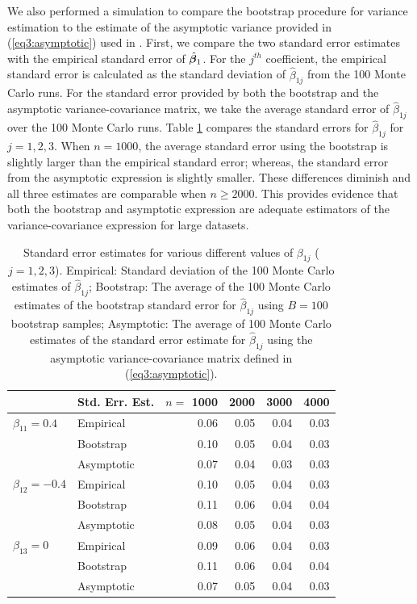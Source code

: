 We also performed a simulation to compare the bootstrap procedure for variance estimation to the estimate of the asymptotic variance provided in (\ref{eq3:asymptotic}) used in . First, we compare the two standard error estimates with the empirical standard error of $\hat{\bm \beta}_{1}$. For the $j^{th}$ coefficient, the empirical standard error is calculated as the standard deviation of $\hat{\beta}_{1j}$ from the 100 Monte Carlo runs. For the standard error provided by both the bootstrap and the asymptotic variance-covariance matrix, we take the average standard error of $\hat{\beta}_{1j}$ over the 100 Monte Carlo runs. Table \ref{table3} compares the standard errors for $\hat{\beta}_{1j}$ for $j = 1, 2, 3$. When $n = 1000$, the average standard error using the bootstrap is slightly larger than the empirical standard error; whereas, the standard error from the asymptotic expression is slightly smaller. These differences diminish and all three estimates are comparable when $n \geq 2000$. This provides  evidence that both the bootstrap and asymptotic expression are adequate estimators of the variance-covariance expression for large datasets. 

\begin{table}[t]
\centering
\setlength{\tabcolsep}{3.2pt}
\caption{Standard error estimates for various different values of $\beta_{1j}$ ($j = 1, 2, 3$). Empirical: Standard deviation of the 100 Monte Carlo estimates of $\hat{\beta}_{1j}$; Bootstrap: The average of the 100 Monte Carlo estimates of the bootstrap standard error for $\hat{\beta}_{1j}$ using $B = 100$ bootstrap samples; Asymptotic: The average of 100 Monte Carlo estimates of the standard error estimate for $\hat{\beta}_{1j}$ using the asymptotic variance-covariance matrix defined in (\ref{eq3:asymptotic}). }
\begin{tabular}{llrrrr}
  \toprule
 & Std. Err.  Est. & $n=$ 1000 & 2000 & 3000 & 4000 \\ 
  \midrule
$\beta_{11} = 0.4$ & Empirical & 0.06 & 0.05 & 0.04 & 0.03 \\ 
   & Bootstrap & 0.10 & 0.05 & 0.04 & 0.03 \\ 
   & Asymptotic & 0.07 & 0.04 & 0.03 & 0.03 \\ 
   \midrule
$\beta_{12} = -0.4$ & Empirical & 0.10 & 0.05 & 0.04 & 0.03 \\ 
  & Bootstrap & 0.11 & 0.06 & 0.04 & 0.04 \\ 
  & Asymptotic & 0.08 & 0.05 & 0.04 & 0.03 \\ 
  \midrule
$\beta_{13} = 0$ & Empirical & 0.09 & 0.06 & 0.04 & 0.03 \\ 
  & Bootstrap & 0.11 & 0.06 & 0.04 & 0.04 \\ 
  & Asymptotic & 0.07 & 0.05 & 0.04 & 0.03 \\
   \bottomrule
\end{tabular}
\label{table3}
\end{table}

